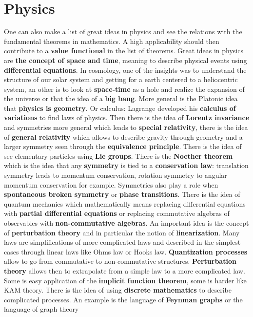 \documentclass[12pt]{amsart}
\newcounter{example}    \def\example#1{ \item \fontsize{12}{15} \selectfont #1 \fontsize{12}{15} \selectfont }
\begin{document}
\section*{Physics} 

One can also make a list of great ideas in physics \cite{CenturyIdeas} and see the 
relations with the fundamental theorems in mathematics. A high applicability should then
contribute to a {\bf value functional} in the list of theorems. 
Great ideas in physics are {\bf the concept of space and time}, meaning to describe 
physical events using {\bf differential equations}. In cosmology, one of the insights was
to understand the structure of our solar system and getting for a earth centered to a heliocentric system,
an other is to look at {\bf space-time} as a hole and realize the expansion of the universe or that the idea of a
{\bf big bang}. More general is the Platonic idea that {\bf physics is geometry}. Or calculus:
Lagrange developed his {\bf calculus of variations} to find laws of physics. Then there is the idea of
{\bf Lorentz invariance} and symmetries more general which leads to {\bf special relativity}, there
is the idea of {\bf general relativity} which allows to describe gravity through 
geometry and a larger symmetry seen through the {\bf equivalence principle}. 
There is the idea of see elementary particles using {\bf Lie groups}.
There is the {\bf Noether theorem} which is the idea that any {\bf symmetry} is tied
to a {\bf conservation law}: translation symmetry leads to momentum conservation,
rotation symmetry to angular momentum conservation for example. Symmetries also play a role
when {\bf spontaneous broken symmetry} or {\bf phase transitions}. 
There is the idea of quantum mechanics which mathematically 
means replacing differential equations with {\bf partial differential equations} or
replacing commutative algebras of observables with {\bf non-commutative algebras}. 
An important idea is the concept of {\bf perturbation theory} and in particular the
notion of {\bf linearization}. Many laws are simplifications of more complicated laws
and described in the simplest cases through linear laws like Ohms law or Hooks law. 
{\bf Quantization processes} allow to go from commutative to non-commutative structures. 
{\bf Perturbation theory} allows then to extrapolate from a simple law to a more complicated
law. Some is easy application of the {\bf implicit function theorem}, some is harder like
KAM theory. There is the idea of using {\bf discrete mathematics} to describe complicated 
processes. An example is the language of {\bf Feynman graphs} or the language of graph theory
\end{document}
